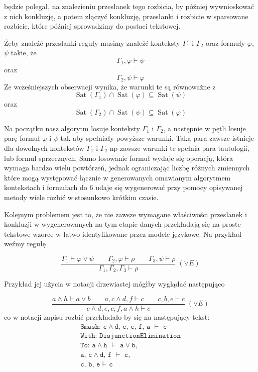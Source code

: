\documentclass[shortabstract]{iithesis}
\theoremstyle{definition}
\theoremstyle{remark}
\theoremstyle{plain}
\begin{document}
będzie polegał, na znalezieniu przesłanek tego rozbicia, by później wywnioskować z nich konkluzję, a potem złączyć konkluzję, przesłanki i rozbicie w sparsowane rozbicie,
które później sprowadzimy do postaci tekstowej.

Żeby znaleźć przesłanki reguły musimy znaleźć konteksty $\Gamma_1$ i $\Gamma_2$ oraz formuły $\varphi$, $\psi$
takie, że 
$$\Gamma_1,\varphi \vdash \psi$$
oraz
$$\Gamma_2,\psi \vdash \varphi$$
Ze wcześniejszych obserwacji wynika, że warunki te są równoważne z
$$\operatorname{Sat}(\Gamma_1) \cap \operatorname{Sat}(\varphi) \subseteq \operatorname{Sat}(\psi)$$
oraz
$$\operatorname{Sat}(\Gamma_2) \cap \operatorname{Sat}(\psi) \subseteq \operatorname{Sat}(\varphi)$$

Na początku nasz algorytm losuje konteksty $\Gamma_1$ i $\Gamma_2$, a następnie w pętli losuje parę formuł $\varphi$ 
i $\psi$ tak aby spełniały powyższe warunki. Taka para zawsze istnieje dla dowolnych kontekstów 
$\Gamma_1$ i $\Gamma_2$ np zawsze warunki te spełnia para tautologii, lub formuł sprzecznych. Samo losowanie 
formuł wydaje się operacją, która wymaga bardzo wielu powtórzeń, jednak ograniczając liczbę różnych zmiennych które 
mogą występować łącznie w generowanych omawianym algorytmem kontekstach i formułach do $6$ udaje się wygenerować przy pomocy opisywanej metody wiele rozbić w stosunkowo krótkim czasie.

Kolejnym problemem jest to, że nie zawsze wymagane właściwości przesłanek i konkluzji w wygenerowanych na tym etapie danych
przekładają się na proste tekstowe wzorce w łatwo identyfikowane przez modele językowe. Na przykład weźmy regułę

$$
\displaystyle
\frac{\Gamma_1 \vdash \varphi \vee \psi \qquad \Gamma_2,\varphi \vdash \rho \qquad \Gamma_3,\psi \vdash \rho}
     {\Gamma_1,\Gamma_2,\Gamma_3 \vdash \rho}\;(\vee E)
$$

Przykład jej użycia w notacji drzewiastej mógłby wyglądać następująco

$$
\displaystyle
\frac{a \wedge h \vdash a \vee b \qquad a , c \wedge d, f \vdash c \qquad c,b,e \vdash c}
     {c \wedge d, e, c, f, a\wedge h \vdash c}\;(\vee E)
$$
co w notacji zapisu rozbić przekładało by się na następujący tekst:
\[
\begin{array}{l}
\texttt{Smash: c}\wedge \texttt{d, e, c, f, a } \vdash \texttt{ c}\\
\texttt{With: DisjunctionElimination} \\
\texttt{To: a}\wedge\texttt{h } \vdash \texttt{ a} \vee \texttt{b,}\\
\texttt{a, c}\wedge\texttt{d, f } \vdash  \texttt{ c,} \\
\texttt{c, b, e }\vdash \texttt{ c}
\end{array}
\]
\end{document}
